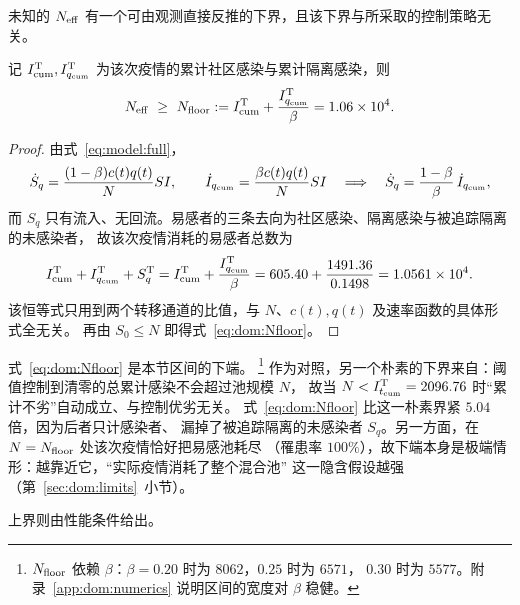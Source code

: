 \documentclass[lang=cn,a4paper,newtx]{elegantpaper}
\numberwithin{equation}{section}
\theoremstyle{plain}
\newcommand{\Itcum}{I_{t_{\mathrm{cum}}}}
\begin{document}
未知的 $N_{\rm eff}$ 有一个可由观测直接反推的下界，且该下界与所采取的控制策略无关。

\begin{proposition}[有效人口下界]\label{prop:dom:floor}
记 $I_{\rm cum}^{\rm T},I_{q_{\rm cum}}^{\rm T}$ 为该次疫情的累计社区感染与累计隔离感染，则
\begin{equation}
  N_{\rm eff}\ \ge\ N_{\rm floor}
  :=I_{\rm cum}^{\rm T}+\frac{I_{q_{\rm cum}}^{\rm T}}{\beta}
  =1.06\times10^{4}.
  \label{eq:dom:Nfloor}
\end{equation}
\end{proposition}
\begin{proof}
由式~\eqref{eq:model:full}，
\[
  \dot S_q=\frac{(1-\beta)c(t)q(t)}{N}SI,
  \qquad
  \dot I_{q_{\rm cum}}=\frac{\beta c(t)q(t)}{N}SI
  \quad\Longrightarrow\quad
  \dot S_q=\frac{1-\beta}{\beta}\,\dot I_{q_{\rm cum}},
\]
而 $S_q$ 只有流入、无回流。易感者的三条去向为社区感染、隔离感染与被追踪隔离的未感染者，
故该次疫情消耗的易感者总数为
\begin{equation}
  I_{\rm cum}^{\rm T}+I_{q_{\rm cum}}^{\rm T}+S_q^{\rm T}
  =I_{\rm cum}^{\rm T}+\frac{I_{q_{\rm cum}}^{\rm T}}{\beta}
  =605.40+\frac{1491.36}{0.1498}
  =1.0561\times10^{4}.
  \label{eq:dom:Sconsumed}
\end{equation}
该恒等式只用到两个转移通道的比值，与 $N$、$c(t),q(t)$ 及速率函数的具体形式全无关。
再由 $S_0\le N$ 即得式~\eqref{eq:dom:Nfloor}。
\end{proof}

式~\eqref{eq:dom:Nfloor} 是本节区间的下端。%
\footnote{$N_{\rm floor}$ 依赖 $\beta$：$\beta=0.20$ 时为 $8062$，$0.25$ 时为 $6571$，
$0.30$ 时为 $5577$。附录~\ref{app:dom:numerics} 说明区间的宽度对 $\beta$ 稳健。}
作为对照，另一个朴素的下界来自：阈值控制到清零的总累计感染不会超过池规模 $N$，
故当 $N<\Itcum^{\rm T}=2096.76$ 时“累计不劣”自动成立、与控制优劣无关。
式~\eqref{eq:dom:Nfloor} 比这一朴素界紧 $5.04$ 倍，因为后者只计感染者、
漏掉了被追踪隔离的未感染者 $S_q$。另一方面，在 $N=N_{\rm floor}$ 处该次疫情恰好把易感池耗尽
（罹患率 $100\%$），故下端本身是极端情形：越靠近它，“实际疫情消耗了整个混合池”
这一隐含假设越强（第~\ref{sec:dom:limits}~小节）。

上界则由性能条件给出。
\end{document}
